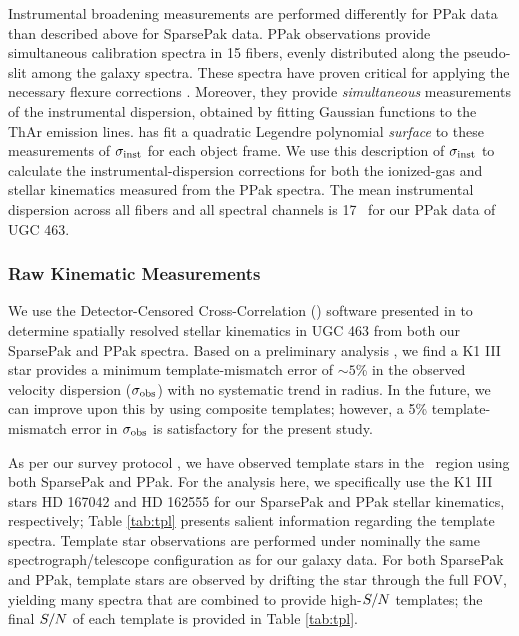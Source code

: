 \documentclass[apj,iop,numberedappendix]{emulateapj}
\begin{document}
Instrumental broadening measurements are performed differently for PPak data
than described above for SparsePak data.  PPak observations provide simultaneous
calibration spectra in 15 fibers, evenly distributed along the pseudo-slit among
the galaxy spectra.  These spectra have proven critical for applying the
necessary flexure corrections \citep{TPKMPhD}.  Moreover, they provide {\it
simultaneous} measurements of the instrumental dispersion, obtained by fitting
Gaussian functions to the ThAr emission lines.  \citet{TPKMPhD} has fit a
quadratic Legendre polynomial {\it surface} to these measurements of $\sigma_{\rm inst}$
for each object frame.  We use this description of $\sigma_{\rm inst}$ to calculate the
instrumental-dispersion corrections for both the ionized-gas and stellar
kinematics measured from the PPak spectra.  The mean instrumental dispersion
across all fibers and all spectral channels is 17 \kms\ for our PPak data of UGC
463.

\subsubsection{Raw Kinematic Measurements}
\label{sec:starkin}

We use the Detector-Censored Cross-Correlation (\dct) software presented in
\citet[][hereafter ]{2011ApJS..193...21W} to
determine spatially resolved stellar kinematics in UGC 463 from both our
SparsePak and PPak spectra.  Based on a preliminary analysis
, we find a K1 III star provides a minimum
template-mismatch error of $\sim 5$\% in the observed velocity dispersion
($\sigma_{\rm obs}$) with no systematic trend in radius.  In the future, we can improve
upon this by using composite templates; however, a 5\% template-mismatch error
in $\sigma_{\rm obs}$ is satisfactory for the present study.

As per our survey protocol , we have observed
template stars in the \mgi\ region using both SparsePak and PPak.  For the
analysis here, we specifically use the K1 III stars HD 167042 and HD 162555 for
our SparsePak and PPak stellar kinematics, respectively; Table \ref{tab:tpl}
presents salient information regarding the template spectra.  Template star
observations are performed under nominally the same spectrograph/telescope
configuration as for our galaxy data.  For both SparsePak and PPak, template
stars are observed by drifting the star through the full FOV, yielding many
spectra that are combined to provide high-$S/N$ templates; the final $S/N$
of each template is provided in Table \ref{tab:tpl}.
\end{document}
